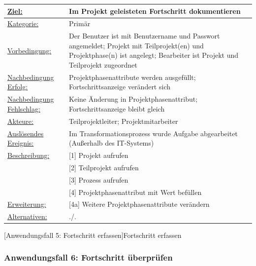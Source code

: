 \label{tab:UC5}
\begin{tabularx}{\textwidth}{|p{}|p{}|}
        \hline
        \underline{Ziel:} & Im Projekt geleisteten Fortschritt dokumentieren \\\hline
        \underline{Kategorie:} & Primär \\\hline
        \underline{Vorbedingung:} & Der Benutzer ist mit Benutzername und Passwort angemeldet; Projekt mit Teilprojekt(en) und Projektphase(n) ist angelegt; Bearbeiter ist Projekt und Teilprojekt zugeordnet \\\hline
        \underline{Nachbedingung Erfolg:} & Projektphasenattribute werden ausgefüllt; Fortschrittsanzeige verändert sich \\\hline
        \underline{Nachbedingung Fehlschlag:} & Keine Änderung in Projektphasenattribut; Fortschrittsanzeige bleibt gleich \\\hline
        \underline{Akteure:} & Teilprojektleiter; Projektmitarbeiter \\\hline
        \underline{Auslösendes Ereignis:} & Im Transformationsprozess wurde Aufgabe abgearbeitet (Außerhalb des IT-Systems)\\\hline        
        \multirow{1}{*}{\underline{Beschreibung:}} & [1] Projekt aufrufen \\
        & [2] Teilprojekt aufrufen \\
        & [3] Prozess aufrufen \\
        & [4] Projektphasenattribut mit Wert befüllen \\\hline
        \multirow{1}{*}{\underline{Erweiterung:}} & [4a] Weitere Projektphasenattribute verändern \\\hline
        \underline{Alternativen:} & ./. \\\hline
\end{tabularx}
[Anwendungsfall 5: Fortschritt erfassen]{Fortschritt erfassen}


\newpage
\subsubsection{Anwendungsfall 6: Fortschritt überprüfen}

